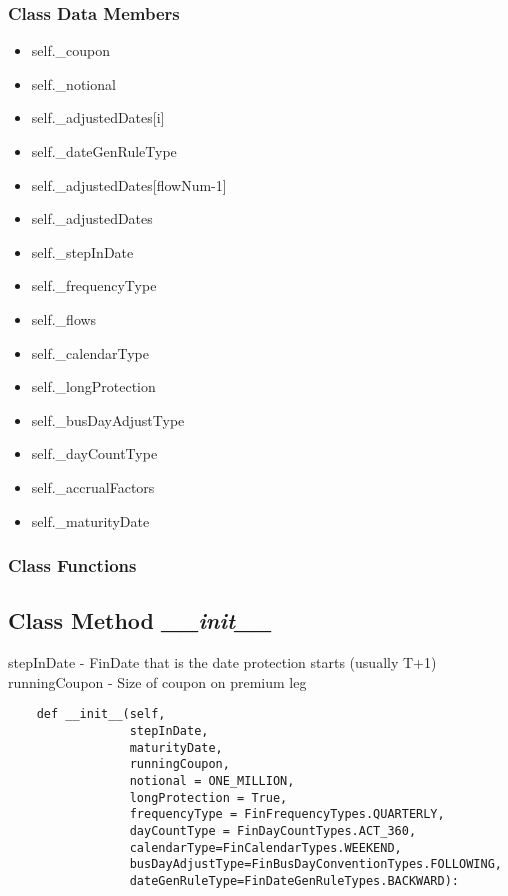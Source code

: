 \documentclass[twoside,11pt]{book}
\begin{document}
\subsubsection{Class Data Members}
\begin{itemize}
\item{self.\_coupon}
\item{self.\_notional}
\item{self.\_adjustedDates[i]}
\item{self.\_dateGenRuleType}
\item{self.\_adjustedDates[flowNum-1]}
\item{self.\_adjustedDates}
\item{self.\_stepInDate}
\item{self.\_frequencyType}
\item{self.\_flows}
\item{self.\_calendarType}
\item{self.\_longProtection}
\item{self.\_busDayAdjustType}
\item{self.\_dayCountType}
\item{self.\_accrualFactors}
\item{self.\_maturityDate}
\end{itemize}

\subsubsection{Class Functions}

\subsection{Class Method {\it \_\_init\_\_}}
stepInDate - FinDate that is the date protection starts (usually T+1) runningCoupon - Size of coupon on premium leg 

\begin{lstlisting}
    def __init__(self,
                 stepInDate,
                 maturityDate,
                 runningCoupon,
                 notional = ONE_MILLION,
                 longProtection = True,
                 frequencyType = FinFrequencyTypes.QUARTERLY,
                 dayCountType = FinDayCountTypes.ACT_360,
                 calendarType=FinCalendarTypes.WEEKEND,
                 busDayAdjustType=FinBusDayConventionTypes.FOLLOWING,
                 dateGenRuleType=FinDateGenRuleTypes.BACKWARD):
\end{lstlisting}
\end{document}
